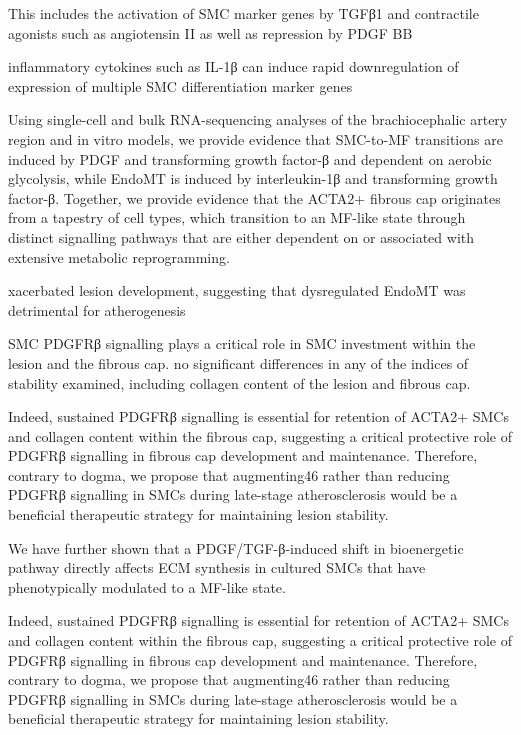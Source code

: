 This includes the activation of SMC marker genes by TGFβ1 and contractile agonists such as angiotensin II as well as repression by PDGF BB

inflammatory cytokines such as IL-1β can induce rapid downregulation of expression of multiple SMC differentiation marker genes
\cite{alexanderEpigeneticControlSmooth2012a}

Using single-cell and bulk RNA-sequencing analyses of the brachiocephalic artery region and in vitro models, we provide evidence that SMC-to-MF transitions are induced by PDGF and transforming growth factor-β and dependent on aerobic glycolysis, while EndoMT is induced by interleukin-1β and transforming growth factor-β. Together, we provide evidence that the ACTA2+ fibrous cap originates from a tapestry of cell types, which transition to an MF-like state through distinct signalling pathways that are either dependent on or associated with extensive metabolic reprogramming.

xacerbated lesion development, suggesting that dysregulated EndoMT was detrimental for atherogenesis

SMC PDGFRβ signalling plays a critical role in SMC investment within the lesion and the fibrous cap. no significant differences in any of the indices of stability examined, including collagen content of the lesion and fibrous cap.

Indeed, sustained PDGFRβ signalling is essential for retention of ACTA2+ SMCs and collagen content within the fibrous cap, suggesting a critical protective role of PDGFRβ signalling in fibrous cap development and maintenance. Therefore, contrary to dogma, we propose that augmenting46 rather than reducing PDGFRβ signalling in SMCs during late-stage atherosclerosis would be a beneficial therapeutic strategy for maintaining lesion stability.

We have further shown that a PDGF/TGF-β-induced shift in bioenergetic pathway directly affects ECM synthesis in cultured SMCs that have phenotypically modulated to a MF-like state.



Indeed, sustained PDGFRβ signalling is essential for retention of ACTA2+ SMCs and collagen content within the fibrous cap, suggesting a critical protective role of PDGFRβ signalling in fibrous cap development and maintenance. Therefore, contrary to dogma, we propose that augmenting46 rather than reducing PDGFRβ signalling in SMCs during late-stage atherosclerosis would be a beneficial therapeutic strategy for maintaining lesion stability.

